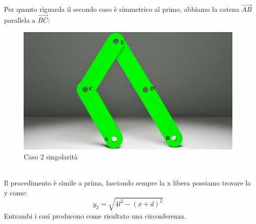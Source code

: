 Per quanto riguarda il secondo caso è simmetrico al primo, abbiamo la catena $\overrightarrow{AB}$ parallela a $\overrightarrow{BC}$:
\begin{figure}[ht]
	\begin{center}
		\includegraphics[scale=0.3]{Immagini/Singolarity/2}
		\caption{Caso 2 singolarità}
	\end{center}
\end{figure}
\\Il procedimento è simile a prima, lasciando sempre la x libera possiamo trovare la y come:
\begin{equation}
    y_2 = \sqrt{4l^2-(x+d)^2}
\end{equation}
Entrambi i casi producono come risultato una circonferenza.
